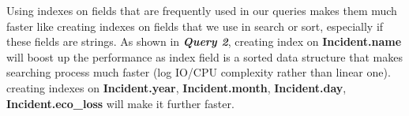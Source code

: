 Using indexes on fields that are frequently used in our queries makes them much faster like creating indexes on fields that we use in search or sort, especially if these fields are strings. As shown in \textbf{\textit{Query 2}}, creating index on \textbf{Incident.name} will boost up the performance as index field is a sorted data structure that makes searching process much faster (log IO/CPU complexity rather than linear one). creating indexes on \textbf{Incident.year}, \textbf{Incident.month}, \textbf{Incident.day}, \textbf{Incident.eco\_loss} will make it further faster.

    


